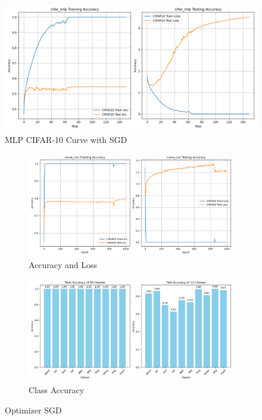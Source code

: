 \documentclass{article}
\begin{document}
\begin{appendix}
\begin{figure}[!htbp]
    \centering
    \includegraphics[width=1\textwidth]{img/Part1/cifar_mlp_b32_sgd.png}
    \caption{MLP CIFAR-10 Curve with SGD}
    \label{fig:p1t3_cifar_sgd}
\end{figure}

\begin{figure}[!htbp]
  \centering
  \begin{subfigure}[b]{1\textwidth}
    \includegraphics[width=\textwidth]{img/Part2/optimizer/curve_cnn_sgd.png}
    \caption{Accuracy and Loss}
  \end{subfigure}
  \begin{subfigure}[b]{1\textwidth}
    \includegraphics[width=\textwidth]{img/Part2/optimizer/acc_cnn_class_sgd.png}
    \caption{Class Accuracy}
  \end{subfigure}
  \caption{Optimizer SGD}
  \label{fig:p2_sgd}
\end{figure}


\end{appendix}
\end{document}
